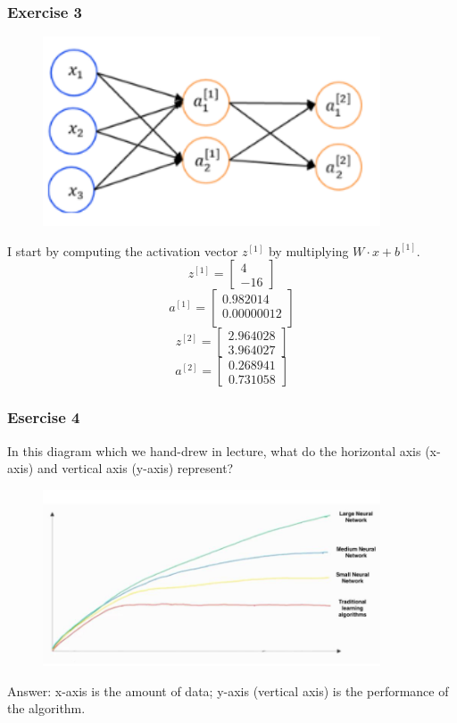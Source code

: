 \subsubsection{Exercise 3}
\begin{figure}[htbp]
    \centering
    \includegraphics[width=10cm]{ExerciseBook/01-NeuralNetwork/exercise3.png}\newline
\end{figure}
I start by computing the activation vector $z^{[1]}$ by multiplying $W\cdot x+b^{[1]}$.
\[ 
    z^{[1]}=
    \begin{bmatrix}
        4 \\
        -16
    \end{bmatrix}
\]
\[ 
    a^{[1]}=
    \begin{bmatrix}
        0.982014 \\
        0.00000012 \\ 
    \end{bmatrix}
\]
\[ 
    z^{[2]}=
    \begin{bmatrix}
        2.964028 \\
        3.964027
    \end{bmatrix}
\]
\[ 
    a^{[2]}=
    \begin{bmatrix}
        0.268941 \\
        0.731058
    \end{bmatrix}
\]
\subsubsection{Esercise 4}
In this diagram which we hand-drew in lecture, what do the horizontal axis (x-axis) and vertical axis (y-axis) represent?
\begin{figure}[htbp]
    \centering
    \includegraphics[width=10cm]{ExerciseBook/01-NeuralNetwork/exercise4.png}\newline
\end{figure}
Answer: x-axis is the amount of data; y-axis (vertical axis) is the performance of the algorithm.
